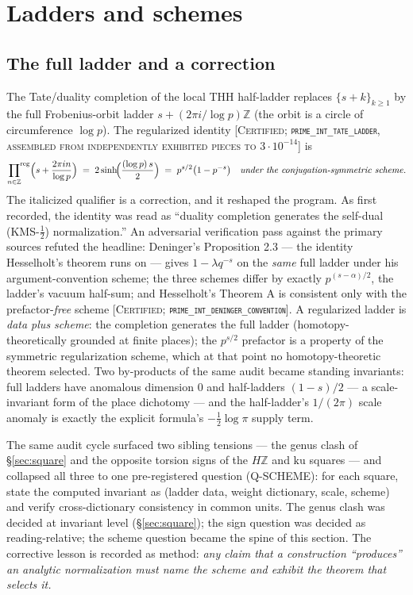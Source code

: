 \documentclass[11pt,reqno]{amsart}
\theoremstyle{plain}
\theoremstyle{definition}
\theoremstyle{remark}
\newcommand{\Z}{\mathbb{Z}}
\newcommand{\HZ}{H\Z}
\newcommand{\ku}{\mathrm{ku}}
\newcommand{\prodreg}{\sideset{}{^{\mathrm{reg}}}\prod}
\newcommand{\grade}[1]{\textup{[\textsc{#1}]}}
\begin{document}
\section{Ladders and schemes}\label{sec:ladders}

\subsection{The full ladder and a correction}\label{subsec:fullladder}

The Tate/duality completion of the local THH half-ladder replaces $\{s + k\}_{k \ge 1}$ by
the full Frobenius-orbit ladder $s + (2\pi i/\log p)\Z$ (the orbit is a circle of
circumference $\log p$). The regularized identity \grade{Certified;
\texttt{prime\_\allowbreak int\_\allowbreak tate\_\allowbreak ladder}, assembled from independently exhibited pieces to
$3\cdot10^{-14}$} is
\[
\prodreg_{n \in \Z}\Bigl(s + \frac{2\pi i n}{\log p}\Bigr)
\;=\; 2\sinh\!\Bigl(\frac{(\log p)\,s}{2}\Bigr)
\;=\; p^{s/2}\bigl(1 - p^{-s}\bigr)
\quad \text{\emph{under the conjugation-symmetric scheme}}.
\]
The italicized qualifier is a correction, and it reshaped the program. As first recorded, the
identity was read as ``duality completion generates the self-dual (KMS-$\tfrac12$)
normalization.'' An adversarial verification pass against the primary sources refuted the
headline: Deninger's Proposition 2.3 \cite{Deninger92} --- the identity Hesselholt's theorem
runs on --- gives $1 - \lambda q^{-s}$ on the \emph{same} full ladder under his
argument-convention scheme; the three schemes differ by exactly $p^{(s-\alpha)/2}$, the
ladder's vacuum half-sum; and Hesselholt's Theorem A \cite{Hesselholt16} is consistent only
with the prefactor-\emph{free} scheme \grade{Certified;
\texttt{prime\_\allowbreak int\_\allowbreak deninger\_\allowbreak convention}}. A regularized ladder is \emph{data plus scheme}:
the completion generates the full ladder (homotopy-theoretically grounded at finite places);
the $p^{s/2}$ prefactor is a property of the symmetric regularization scheme, which at that
point no homotopy-theoretic theorem selected. Two by-products of the same audit became
standing invariants: full ladders have anomalous dimension $0$ and half-ladders
$(1-s)/2$ --- a scale-invariant form of the place dichotomy --- and the half-ladder's
$1/(2\pi)$ scale anomaly is exactly the explicit formula's $-\tfrac12\log\pi$ supply term.

The same audit cycle surfaced two sibling tensions --- the genus clash of
\S\ref{sec:square} and the opposite torsion signs of the $\HZ$ and $\ku$ squares --- and
collapsed all three to one pre-registered question (Q-SCHEME): for each square, state the
computed invariant as (ladder data, weight dictionary, scale, scheme) and verify
cross-dictionary consistency in common units. The genus clash was decided at invariant level
(\S\ref{sec:square}); the sign question was decided as reading-relative; the scheme question
became the spine of this section. The corrective lesson is recorded as method: \emph{any
claim that a construction ``produces'' an analytic normalization must name the scheme and
exhibit the theorem that selects it.}
\end{document}
